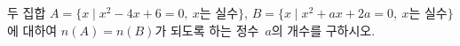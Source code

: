 두 집합 $A=\{x \mid x^2-4x+6=0,\ x$는 실수$\}$, $B=\{x \mid x^2+ax+2a=0,\ x$는 실수$\}$에 대하여 $n(A)=n(B)$가 되도록 하는 정수~$a$의 개수를 구하시오.
